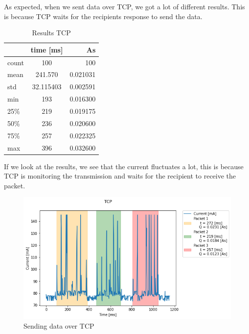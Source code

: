 As expected, when we sent data over TCP, we got a lot of different results.
This is because TCP waits for the recipients response to send the data. \cite{postel1981transmission}
\newline
\begin{table}[htbp]
\begin{center}
\caption{Results TCP}
\label{tab:table1}
\renewcommand{\arraystretch}{1.8}
\begin{tabular}{l|c|r}
& \textbf{time [ms]} & \textbf{As}\\
\hline
count & 100 & 100\\
mean & 241.570 & 0.021031\\
std & 32.115403 & 0.002591\\
min & 193 & 0.016300\\
25\%  & 219 & 0.019175\\
50\% & 236 & 0.020600\\
75\%  & 257 & 0.022325\\
max & 396 & 0.032600\\
\end{tabular}
\end{center}
\end{table}
\newline
If we look at the results, we see that the current fluctuates a lot,
this is because TCP is monitoring the transmission 
and waits for the recipient to receive the packet.
\newline
\begin{figure}[H]
\centering
\includegraphics[width = 1 \linewidth]{fig/udp_tcp/tcp_s_m.png}
\caption{Sending data over TCP}
\label{fig:tcp_s_m}
\end{figure}

